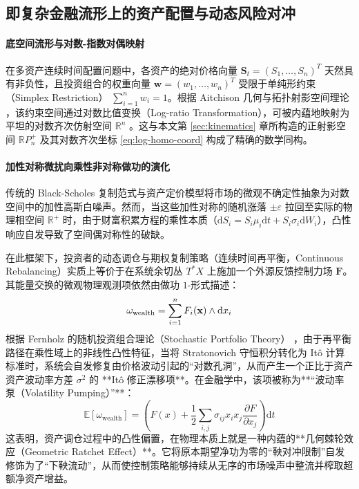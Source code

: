 ﻿\documentclass[10pt,a4paper]{article}
\numberwithin{equation}{section}
\begin{document}
\subsection{即复杂金融流形上的资产配置与动态风险对冲}

\paragraph{底空间流形与对数-指数对偶映射}
在多资产连续时间配置问题中，各资产的绝对价格向量 $\mathbf S_t = (S_1, \ldots, S_n)^T$ 天然具有非负性，且投资组合的权重向量 $\mathbf w = (w_1, \ldots, w_n)^T$ 受限于单纯形约束（Simplex Restriction） $\sum_{i=1}^n w_i = 1$。根据 Aitchison 几何与拓扑射影空间理论 \cite{Aitchison1986}，该约束空间通过对数比值变换（Log-ratio Transformation），可被内蕴地映射为平坦的对数齐次仿射空间 $\mathbb{R}^n$ \cite{PawlowskyGlahnEgozcue2001}。这与本文第 \ref{sec:kinematics} 章所构造的正射影空间 $\mathbb R P^+_n$ 及其对数齐次坐标 \eqref{eq:log-homo-coord} 构成了精确的数学同构。

\paragraph{加性对称微扰向乘性非对称做功的演化}
传统的 Black-Scholes 复制范式与资产定价模型将市场的微观不确定性抽象为对数空间中的加性高斯白噪声。然而，当这些加性对称的随机涨落 $\pm\varepsilon$ 拉回至实际的物理相空间 $\mathbb{R}^+$ 时，由于财富积累方程的乘性本质（$\mathrm dS_i = S_i \mu_i \mathrm dt + S_i \sigma_i \mathrm dW_i$），凸性响应自发导致了空间偶对称性的破缺。

在此框架下，投资者的动态调仓与期权复制策略（连续时间再平衡，Continuous Rebalancing）实质上等价于在系统余切丛 $T^*X$ 上施加一个外源反馈控制力场 $\mathbf F$。其能量交换的微观物理观测项依然由做功 $1$-形式描述：
\begin{equation}
    \omega_{\text{wealth}} = \sum_{i=1}^n F_i(\mathbf x) \wedge \text dx_i
\end{equation}
根据 Fernholz 的随机投资组合理论（Stochastic Portfolio Theory） \cite{Fernholz2002Stochastic, Karatzas2007Stochastic}，由于再平衡路径在乘性域上的非线性凸性特征，当将 Stratonovich 守恒积分转化为 It\^{o} 计算标准时，系统会自发修复由价格波动引起的“对数孔洞”，从而产生一个正比于资产资产波动率方差 $\sigma^2$ 的 **It\^{o} 修正漂移项**。在金融学中，该项被称为**“波动率泵（Volatility Pumping）”**：
\begin{equation}
    \mathbb{E}[\omega_{\text{wealth}}] = \left( F(x) + \frac{1}{2}\sum_{i,j} \sigma_{ij} x_i x_j \frac{\partial F}{\partial x_j} \right) \mathrm{d}t
\end{equation}
这表明，资产调仓过程中的凸性偏置，在物理本质上就是一种内蕴的**几何棘轮效应（Geometric Ratchet Effect）**。它将原本期望净功为零的“鞅对冲限制”自发修饰为了“下鞅流动”，从而使控制策略能够持续从无序的市场噪声中整流并榨取超额净资产增益。
\end{document}
